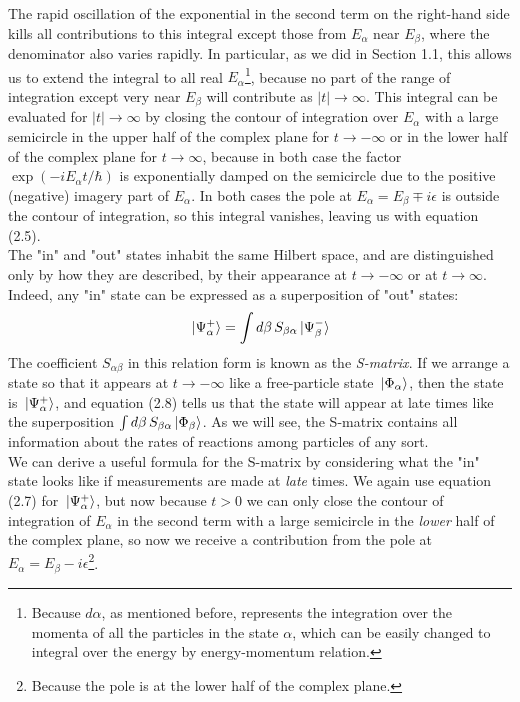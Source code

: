 \documentclass[12pt]{article}
\numberwithin{equation}{section}
\begin{document}
The rapid oscillation of the exponential in the second term on the right-hand side kills all contributions to this integral except those from $E_{\alpha}$ near $E_{\beta}$, where the denominator also varies rapidly. 
In particular, as we did in Section 1.1, this allows us to extend the integral to all real $E_{\alpha}$\footnote{Because $d\alpha$, as mentioned before, represents the integration over the momenta of all the particles in the state $\alpha$, which can be easily changed to integral over the energy by energy-momentum relation.}, because no part of the range of integration except very near $E_{\beta}$ will contribute as $|t|\rightarrow\infty$.
This integral can be evaluated for $|t|\rightarrow\infty$ by closing the contour of integration over $E_{\alpha}$ with a large semicircle in the upper half of the complex plane for $t\rightarrow-\infty$ or in the lower half of the complex plane for $t\rightarrow\infty$, because in both case the factor $\exp(-iE_{\alpha}t/\hbar)$ is exponentially damped on the semicircle due to the positive (negative) imagery part of $E_{\alpha}$.
In both cases the pole at $E_{\alpha} = E_{\beta}\mp i\epsilon$ is outside the contour of integration, so this integral vanishes, leaving us with equation (2.5).
\\\indent The "in" and "out" states inhabit the same Hilbert space, and are distinguished only by how they are described, by their appearance at $t\rightarrow-\infty$ or at $t\rightarrow\infty$.
Indeed, any "in" state can be expressed as a superposition of "out" states:
\begin{equation}
    \ket*{\Psi_{\alpha}^{+}} = \int{d\beta\, S_{\beta\alpha}\ket*{\Psi_{\beta}^{-}}}
\end{equation}
The coefficient $S_{\alpha\beta}$ in this relation form is known as the \textit{S-matrix}.
If we  arrange a state so that it appears at $t\rightarrow-\infty$ like a free-particle state $\ket*{\Phi_{\alpha}}$, then the state is $\ket*{\Psi_{\alpha}^{+}}$, and equation (2.8) tells us that the state will appear at late times like the superposition $\int{d\beta\,S_{\beta\alpha}\ket*{\Phi_{\beta}}}$.
As we will see, the S-matrix contains all information about the rates of reactions among particles of any sort.
\\\indent We can derive a useful formula for the S-matrix by considering what the "in" state looks like if measurements are made at \textit{late} times.
We again use equation (2.7) for $\ket*{\Psi_{\alpha}^{+}}$, but now because $t>0$ we can only close the contour of integration of $E_{\alpha}$ in the second term with a large semicircle in the \textit{lower} half of the complex plane, so now we receive a contribution from the pole at $E_{\alpha} = E_{\beta}-i\epsilon$\footnote{Because the pole is at the lower half of the complex plane.}.
\end{document}
